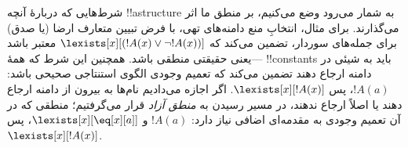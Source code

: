 \documentclass[../../../include/open-logic-section]{subfiles}
\begin{document}
\begin{digress}
شرط‌هایی که دربارهٔ آنچه !!a{structure} به شمار می‌رود وضع می‌کنیم،
بر منطق ما اثر می‌گذارند. برای مثال، انتخابِ منع دامنه‌های تهی، با فرض
تبیین متعارف ارضا (یا صدق) برای جمله‌های سور‌دار، تضمین می‌کند که
$\lexists[x][(!A(x) \lor \lnot !A(x))]$ معتبر باشد---یعنی حقیقتی
منطقی باشد. همچنین این شرط که همهٔ !!{constant}s باید به شیئی در دامنه
ارجاع دهند تضمین می‌کند که تعمیم وجودی الگوی استنتاجی صحیحی باشد:
$!A(a)$، پس $\lexists[x][!A(x)]$. اگر اجازه می‌دادیم نام‌ها به بیرون
از دامنه ارجاع دهند یا اصلاً ارجاع ندهند، در مسیر رسیدن به
\emph{منطق آزاد} قرار می‌گرفتیم؛ منطقی که در آن تعمیم وجودی به مقدمه‌ای
اضافی نیاز دارد: $!A(a)$ و $\lexists[x][\eq[x][a]]$، پس
$\lexists[x][!A(x)]$.
\end{digress}
\end{document}

